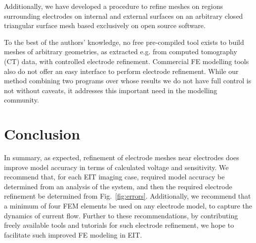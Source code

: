 \documentclass[12pt]{iopart}
\begin{document}
 
Additionally, we have developed a procedure to refine meshes on regions surrounding electrodes 
on internal and external surfaces on an arbitrary closed triangular surface mesh based exclusively on
open source software. 

To the best of the
authors' knowledge, no free pre-compiled tool exists to build meshes of
arbitrary geometries, as extracted e.g. from computed tomography (CT) data,
with controlled electrode refinement. Commercial FE modelling tools also do not offer an
easy interface to perform electrode refinement.
While our method combining two programs over whose results we do not have
full control is not without caveats, it addresses this important need in the
modelling community. 

\section{Conclusion}

In summary, as expected, refinement of electrode meshes near electrodes 
does improve model accuracy in terms of calculated voltage and sensitivity.
We recommend that, for each EIT imaging case, required model accuracy be
determined from an analysis of the system, and then the required electrode refinement 
be determined from Fig.\ \ref{fig:errors}. Additionally, we recommend that
a minimum of four FEM elements be used on any electrode model, to capture
the dynamics of current flow.
Further to these recommendations, by contributing freely available tools and 
tutorials for such electrode
refinement, we hope to facilitate such improved FE modeling in EIT.


  

  
 
\printbibliography
\end{document}
